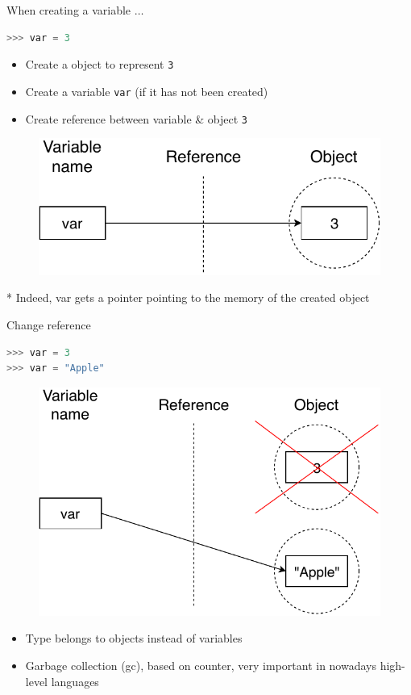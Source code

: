 \documentclass{../TexTemplate/myslide}
\begin{document}
\begin{frame}[fragile]{When creating a variable $\ldots$}
\begin{lstlisting}[language=python]
>>> var = 3
\end{lstlisting}
\begin{itemize}
	\item Create a object to represent \verb'3'
	\item Create a variable \verb'var' (if it has not been created)
	\item Create reference between variable \& object \verb'3'
\end{itemize}
\begin{figure}
\centering
\includegraphics[width=0.5\linewidth]{fig/python-reference.pdf}
\end{figure}
* Indeed, var gets a pointer pointing to the memory of the created object
\end{frame}

\begin{frame}[fragile]{Change reference}
\begin{lstlisting}[language=python]
>>> var = 3
>>> var = "Apple"
\end{lstlisting}
\begin{figure}
\centering
\includegraphics[width=0.5\linewidth]{fig/python-newref.pdf}
\end{figure}
\begin{itemize}
	\item Type belongs to objects instead of variables
	\item Garbage collection (gc), based on counter, very important in nowadays high-level languages
\end{itemize}
\end{frame}
\end{document}
